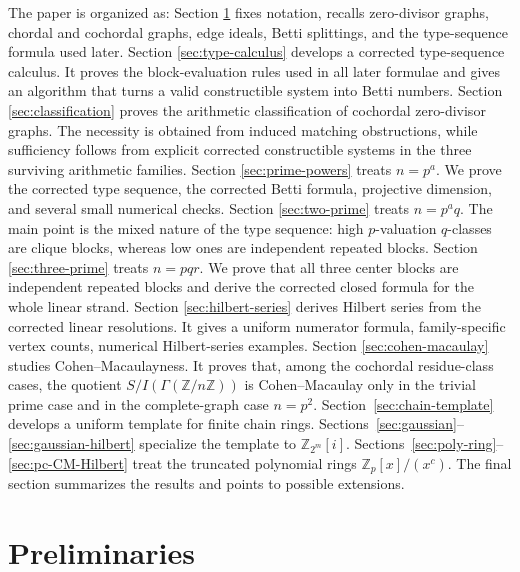 \documentclass[12pt]{article}
\theoremstyle{definition}
\begin{document}
The paper is organized as: Section \ref{sec:preliminaries} fixes notation, recalls zero-divisor graphs, chordal and cochordal graphs, edge ideals, Betti splittings, and the type-sequence formula used later.  Section \ref{sec:type-calculus} develops a corrected type-sequence calculus.  It proves the block-evaluation rules used in all later formulae and gives an algorithm that turns a valid constructible system into Betti numbers. Section \ref{sec:classification} proves the arithmetic classification of cochordal zero-divisor graphs.  The necessity is obtained from induced matching obstructions, while sufficiency follows from explicit corrected constructible systems in the three surviving arithmetic families.
Section  \ref{sec:prime-powers} treats $n=p^a$.  We prove the corrected type sequence, the corrected Betti formula, projective dimension, and several small numerical checks. Section \ref{sec:two-prime} treats $n=p^a q$.  The main point is the mixed nature of the type sequence: high $p$-valuation $q$-classes are clique blocks, whereas low ones are independent repeated blocks.
 Section \ref{sec:three-prime} treats $n=pqr$.  We prove that all three center blocks are independent repeated blocks and derive the corrected closed formula for the whole linear strand.
Section \ref{sec:hilbert-series} derives Hilbert series from the corrected linear resolutions.  It gives a uniform numerator formula, family-specific vertex counts, numerical Hilbert-series examples.
Section \ref{sec:cohen-macaulay} studies Cohen--Macaulayness.  It proves that, among the cochordal residue-class cases, the quotient $S/I(\Gamma(\mathbb{Z}/n\mathbb{Z}))$ is Cohen--Macaulay only in the trivial prime case and in the complete-graph case $n=p^2$.
 Section~\ref{sec:chain-template} develops a uniform template for finite chain rings.  Sections~\ref{sec:gaussian}--\ref{sec:gaussian-hilbert} specialize the template to \(\mathbb{Z}_{2^m}[i]\).  Sections~\ref{sec:poly-ring}--\ref{sec:pc-CM-Hilbert} treat the truncated polynomial rings \(\mathbb{Z}_p[x]/(x^c)\).  The final section summarizes the results and points to possible extensions.
\section{Preliminaries}\label{sec:preliminaries}
\end{document}

